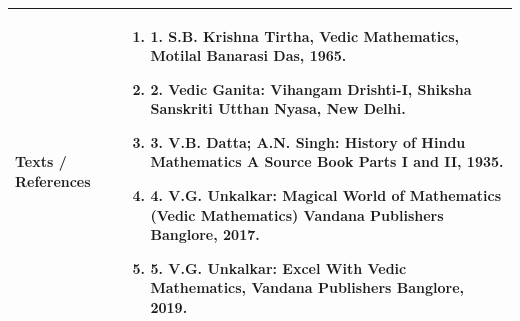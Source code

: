 \documentclass[11pt,a4paper]{article}
\begin{document}
\vspace{8pt}
\renewcommand{\arraystretch}{1.3}
\begin{tabularx}{\textwidth}{|p{3.2cm}|X|}
\hline
\textbf{Texts / References} & \begin{enumerate}[leftmargin=*,noitemsep,topsep=2pt]  \item 1. S.B. Krishna Tirtha, Vedic Mathematics, Motilal Banarasi Das, 1965.  \item 2. Vedic Ganita: Vihangam Drishti-I, Shiksha Sanskriti Utthan Nyasa, New Delhi.  \item 3. V.B. Datta; A.N. Singh: History of Hindu Mathematics A Source Book Parts I and II, 1935.  \item 4. V.G. Unkalkar: Magical World of Mathematics (Vedic Mathematics) Vandana Publishers  Banglore, 2017.  \item 5. V.G. Unkalkar: Excel With Vedic Mathematics, Vandana Publishers Banglore, 2019.\end{enumerate} \\
\hline
\end{tabularx}
\clearpage
\end{document}
